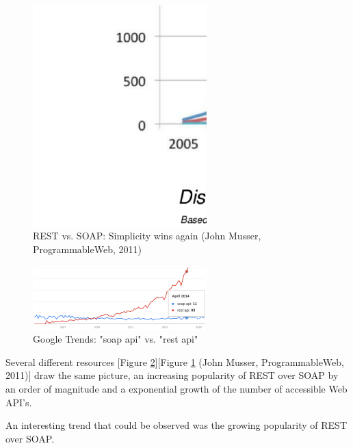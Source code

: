 \begin{figure}[!ht]
	\centering
  \includegraphics[width=0.6\textwidth]{figures/slide-11-1024}
	\caption{REST vs. SOAP: Simplicity wins again (John Musser, ProgrammableWeb, 2011)}
	\label{fig:slide-11-1024}
\end{figure}

\begin{figure}[!ht]
  \centering
  \includegraphics[width=0.6\textwidth]{figures/googleTrends_Rest-SOAP}
  \caption{Google Trends: "soap api" vs. "rest api"}
  \label{fig:googleTrends_Rest-SOAP}
\end{figure}
Several different resources [Figure \ref{fig:googleTrends_Rest-SOAP}][Figure \ref{fig:slide-11-1024} (John Musser, ProgrammableWeb, 2011)] draw the same picture, an increasing popularity of REST over SOAP by an order of magnitude and a exponential growth of the number of accessible Web API's.

An interesting trend that could be observed was the growing popularity of REST over SOAP.~\cite{ploscar2012xml}




